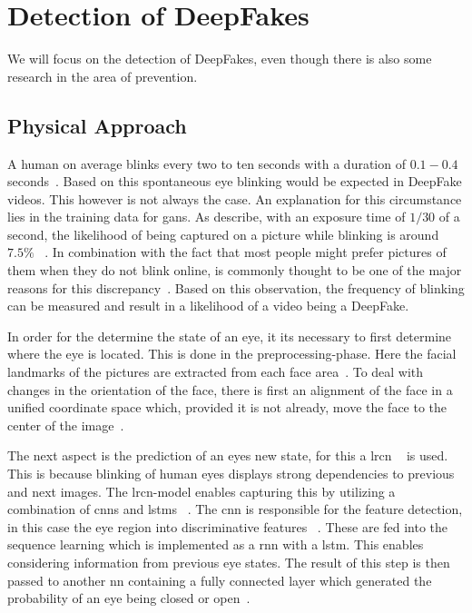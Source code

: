 \section{Detection of DeepFakes}
We will focus on the detection of DeepFakes, even though there is also some 
research in the area of prevention.

\subsection{Physical Approach}
A human on average blinks every two to ten seconds with a duration of \(0.1-0.4\)
seconds~\cite{li_ictu_2018}. Based on this spontaneous eye blinking would be
expected in DeepFake videos. This however is not always the case. An explanation
for this circumstance lies in the training data for \glspl{gan}. As 
\textcite{li_ictu_2018} describe, with an exposure time of \(1/30\) of a second,
the likelihood of being captured on a picture while blinking is around \(7.5\%\)
~\cite{li_ictu_2018}. In combination with the fact that most people might prefer
pictures of them when they do not blink online, is commonly thought to be one of
the major reasons for this discrepancy~\cite{pishori_detecting_2020}. Based on
this observation, the frequency of blinking can be measured and result in a 
likelihood of a video being a DeepFake.

\par
In order for the determine the state of an eye, it its necessary to first determine
where the eye is located. This is done in the preprocessing-phase. Here the facial
landmarks of the pictures are extracted from each face area~\cite{li_ictu_2018}.
To deal with changes in the orientation of the face, there is first an alignment
of the face in a unified coordinate space which, provided it is not already,
move the face to the center of the image~\cite{li_ictu_2018}.

\par
The next aspect is the prediction of an eyes new state, for this a \gls{lrcn}
~\cite{donahue_long-term_2014} is used. This is because blinking of human eyes
displays strong dependencies to previous and next images. The \gls{lrcn}-model 
enables capturing this by utilizing a combination of \glspl{cnn} and \glspl{lstm}
~\cite{donahue_long-term_2014}. The \gls{cnn} is responsible for the feature
detection, in this case the eye region into discriminative features
~\cite{li_ictu_2018,donahue_long-term_2014}. 
These are fed into the sequence learning which is implemented as a \gls{rnn} 
with a \gls{lstm}. This enables considering information from previous eye states.
The result of this step is then passed to another \gls{nn} containing a fully
connected layer which generated the probability of an eye being closed or open~\cite{li_ictu_2018}.


